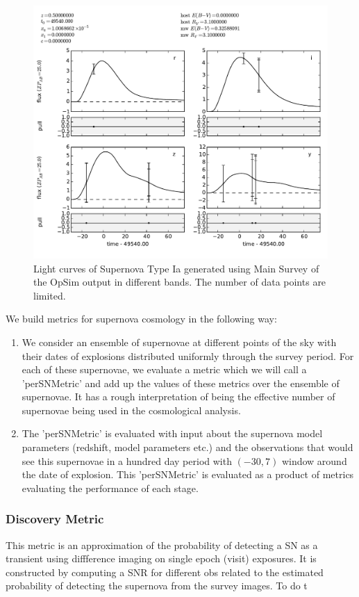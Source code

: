 \begin{figure}[tbh!]
\includegraphics[angle=0,width=0.99\hsize:,clip]{figs/SN_309_lc.pdf}
\caption{Light curves of Supernova Type Ia generated using Main Survey of the OpSim output in different bands. The number of data points are limited. 
}
\label{fig:SNIaLCopsimmain}
\end{figure}
We build metrics for supernova cosmology in the following way:
\begin{enumerate}
\item We consider an ensemble of supernovae at different points of the sky with  their dates of explosions distributed uniformly through the survey period. For each of these supernovae, we evaluate a metric which we will call a 'perSNMetric' and add up the values of these metrics over the ensemble of supernovae. It has a rough interpretation of being the effective number of supernovae being used in the cosmological analysis.
\item The 'perSNMetric' is evaluated with input about the supernova model parameters (redshift, model parameters etc.) and the observations that would see this supernovae in a hundred day period with $(-30, 7)$ window around the date of
explosion. This 'perSNMetric' is evaluated as a product of metrics evaluating
the performance of each stage. 
\end{enumerate}

\subsubsection{Discovery Metric}
This metric is an approximation of the probability of detecting a SN as a transient using diffference imaging on single epoch (visit) exposures. It is constructed by computing a SNR for different obs
related to the estimated probability of detecting the supernova
from the survey images. To do t


